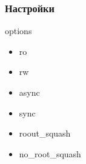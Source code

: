 \begin{frame}[fragile]
    \frametitle{Настройки}
   options
    \begin{itemize}
        \item ro 
        \item rw
        \item async
        \item sync
        \item roout\_squash
        \item no\_root\_squash
    \end{itemize}

\end{frame}